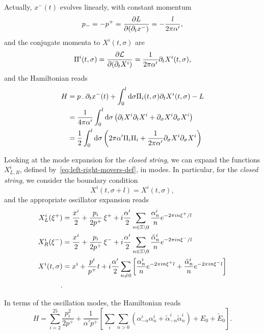 Actually, $x^-(t)$ evolves linearly, with constant momentum
\begin{equation}
    p_- = - p^+ = \frac{\partial L}{\partial (\partial_t x^-)} = - \frac{l}{2\pi \alpha'},
\end{equation}
and the conjugate momenta to $X^i(t,\sigma)$ are
\begin{equation}
    \Pi^i(t,\sigma) = \frac{\partial \mathcal{L}}{\partial(\partial_t X^i)} = \frac{1}{2 \pi \alpha'} \partial_t X^i(t,\sigma),
\end{equation}
and the Hamiltonian reads
\begin{equation}
\begin{split}
    H &= p_- \partial_t x^-(t) + \int_0^l \mathop{}\!\mathrm{d} \sigma \Pi_i(t,\sigma) \partial_t X^i(t,\sigma) - L \\
      &= \frac{1}{4\pi\alpha'} \int_0^l \mathop{}\!\mathrm{d} \sigma \left( \partial_t X^i \partial_t X^i + \partial_\sigma X^i \partial_\sigma X^i\right) \\
      &= \frac{1}{2} \int_0^l \mathop{}\!\mathrm{d} \sigma \left( 2\pi\alpha' \Pi_i \Pi_i + \frac{1}{2\pi\alpha'} \partial_\sigma X^i \partial_\sigma X^i \right)
\end{split}
\end{equation}

Looking at the mode expansion for the \emph{closed string}, we can expand the functions $X^i_{L,R}$, defined by~\eqref{eq:left-right-movers-def}, in modes. In particular, for the \emph{closed string}, we consider the boundary condition
\begin{equation}
    X^i (t, \sigma + l) = X^i(t,\sigma) ,
\end{equation}
and the appropriate oscillator expansion reads
\begin{align}
    X^i_L (\xi^+) &= \frac{x^i}{2} + \frac{p_i}{2p^+} \, \xi^+ + i \frac{\alpha'}{2} \sum_{n \in \mathbb{Z} \setminus {0}} \frac{\alpha^i_n}{n} e^{-2\pi i n \xi^+ / l } \\
    X^i_R (\xi^-) &= \frac{x^i}{2} + \frac{p_i}{2p^+} \, \xi^- + i \frac{\alpha'}{2} \sum_{n \in \mathbb{Z} \setminus {0}} \frac{\tilde{\alpha}^i_n}{n} e^{-2\pi i n \xi^- / l }\\
    X^i (t,\sigma) &= x^i + \frac{p^i}{p^+} t + i \frac{\alpha'}{2} \sum_{n \neq 0} \left[ \frac{\alpha^i_n}{n} e^{-2\pi i n \xi^+ l } + \frac{\tilde{\alpha}^i_n}{n} e^{-2\pi i n \xi^- l} \right] \\ .
\end{align}

In terms of the oscillation modes, the Hamiltonian reads
\begin{equation}\label{eq:hamitlonian-modes}
    H = \sum_{i=2}^{25} \frac{p^2_i}{2p^+} + \frac{1}{\alpha' p^+} \left[ \sum_i \sum_{n>0} \left( \alpha^i_{-n} \alpha^i_n + \tilde{\alpha}^i_{-n} \tilde{\alpha}^i_n \right) + E_0 + \tilde{E}_0 \right] .
\end{equation}


